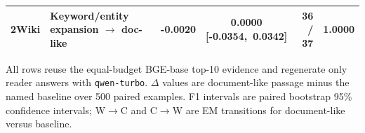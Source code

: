 \begin{table}[htbp]
\begin{tabularx}{\textwidth}{@{}l>{\raggedright\arraybackslash}Xrcrc@{}}
2Wiki & Keyword/entity expansion $\rightarrow$ doc-like & -0.0020 & \shortstack{0.0000\\\mbox{[-0.0354, 0.0342]}} & 36 / 37 & 1.0000 \\
\bottomrule
\end{tabularx}
\begin{tablenotes}
\footnotesize
\item All rows reuse the equal-budget BGE-base top-10 evidence and regenerate only reader answers with \texttt{qwen-turbo}. $\Delta$ values are document-like passage minus the named baseline over 500 paired examples. F1 intervals are paired bootstrap 95\% confidence intervals; W$\rightarrow$C and C$\rightarrow$W are EM transitions for document-like versus baseline.
\end{tablenotes}
\end{table}
